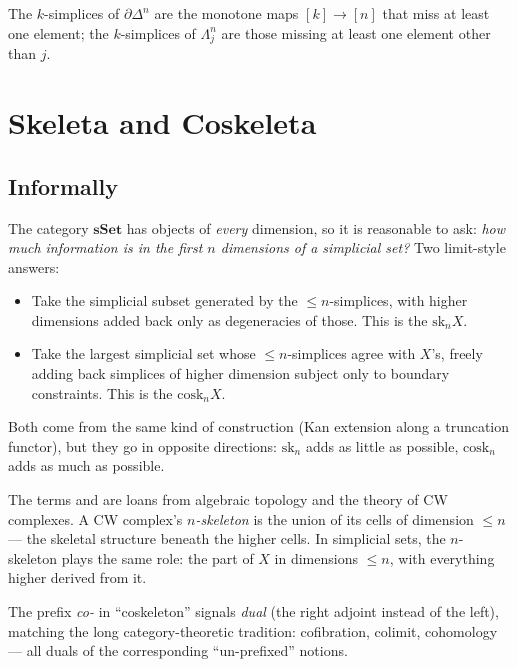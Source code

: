 \begin{lemma}
\label{lem:bdry-horn-simplices}
The $k$-simplices of $\partial\Delta^n$ are the monotone maps $[k] \to [n]$
that miss at least one element; the $k$-simplices of $\Lambda^n_j$ are
those missing at least one element other than $j$.
\end{lemma}


\section{Skeleta and Coskeleta}
\label{sec:skeleta}

\subsection{Informally}

The category $\mathbf{sSet}$ has objects of \emph{every} dimension, so
it is reasonable to ask: \emph{how much information is in the first $n$
dimensions of a simplicial set?} Two limit-style answers:

\begin{itemize}
  \item Take the simplicial subset generated by the $\leq n$-simplices,
        with higher dimensions added back only as degeneracies of those.
        This is the  $\mathrm{sk}_n X$.
  \item Take the largest simplicial set whose $\leq n$-simplices agree
        with $X$'s, freely adding back simplices of higher dimension
        subject only to boundary constraints. This is the 
        $\mathrm{cosk}_n X$.
\end{itemize}

Both come from the same kind of construction (Kan extension along a
truncation functor), but they go in opposite directions: $\mathrm{sk}_n$
adds as little as possible, $\mathrm{cosk}_n$ adds as much as possible.

\begin{nameorigin}
The terms  and  are loans from
algebraic topology and the theory of CW complexes. A CW complex's
\emph{$n$-skeleton} is the union of its cells of dimension $\leq n$ — the
skeletal structure beneath the higher cells. In simplicial sets, the
$n$-skeleton plays the same role: the part of $X$ in dimensions
$\leq n$, with everything higher derived from it.

The prefix \emph{co-} in ``coskeleton'' signals \emph{dual} (the right
adjoint instead of the left), matching the long category-theoretic
tradition: cofibration, colimit, cohomology — all duals of the
corresponding ``un-prefixed'' notions.
\end{nameorigin}

